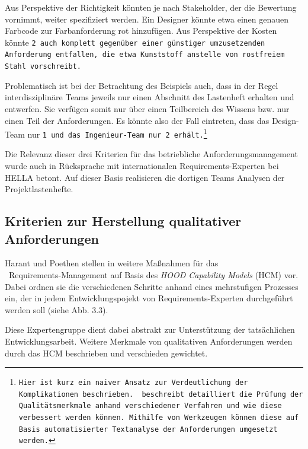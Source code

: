 \documentclass[12pt]{report}
\begin{document}
Aus Perspektive der Richtigkeit könnten je nach Stakeholder, der die Bewertung vornimmt, weiter spezifiziert werden. Ein Designer könnte etwa einen genauen Farbcode zur Farbanforderung \glqq rot\grqq{} hinzufügen. Aus Perspektive der Kosten könnte \tt 2 \rm auch komplett gegenüber einer günstiger umzusetzenden Anforderung entfallen, die etwa \glqq Kunststoff\grqq{} anstelle von \glqq rostfreiem Stahl\grqq{} vorschreibt.

Problematisch ist bei der Betrachtung des Beispiels auch, dass in der Regel interdisziplinäre Teams jeweils nur einen Abschnitt des Lastenheft erhalten und entwerfen. Sie verfügen somit nur über einen Teilbereich des Wissens bzw. nur einen Teil der Anforderungen. Es könnte also der Fall eintreten, dass das Design-Team nur \tt 1 \rm und das Ingenieur-Team nur \tt 2 \rm erhält.\footnote{Hier ist kurz ein naiver Ansatz zur Verdeutlichung der Komplikationen beschrieben. \cite{zg02} beschreibt detailliert die Prüfung der Qualitätsmerkmale anhand verschiedener Verfahren und wie diese verbessert werden können. Mithilfe von Werkzeugen können diese auf Basis automatisierter Textanalyse der Anforderungen umgesetzt werden.}

Die Relevanz dieser drei Kriterien für das betriebliche Anforderungsmanagement wurde auch in Rücksprache mit internationalen Requirements-Experten bei HELLA betont. Auf dieser Basis realisieren die dortigen Teams Analysen der Projektlastenhefte. 

\subsection{Kriterien zur Herstellung qualitativer Anforderungen}
Harant und Poethen stellen in \cite{hp12} weitere Maßnahmen für das \\\ Requirements-Management auf Basis des \textit{HOOD Capability Models} (HCM) vor. Dabei ordnen sie die verschiedenen Schritte anhand eines mehrstufigen Prozesses ein, der in jedem Entwicklungspojekt von Requirements-Experten durchgeführt werden soll (siehe Abb. 3.3). 

Diese Expertengruppe dient dabei abstrakt zur Unterstützung der tatsächlichen Entwicklungsarbeit. Weitere Merkmale von qualitativen Anforderungen werden durch das HCM beschrieben und verschieden gewichtet. 
\end{document}
